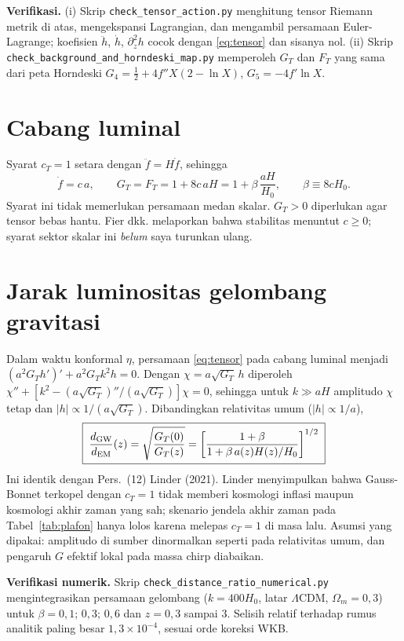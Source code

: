\documentclass[11pt,a4paper]{article}
\begin{document}
\textbf{Verifikasi.} (i) Skrip \texttt{check\_tensor\_action.py} menghitung tensor Riemann metrik di atas, mengekspansi Lagrangian, dan mengambil persamaan Euler-Lagrange; koefisien $\ddot h$, $\dot h$, $\partial_z^2h$ cocok dengan \eqref{eq:tensor} dan sisanya nol. (ii) Skrip \texttt{check\_background\_and\_horndeski\_map.py} memperoleh $G_T$ dan $F_T$ yang sama dari peta Horndeski $G_4=\tfrac12+4f''X(2-\ln X)$, $G_5=-4f'\ln X$.

\section{Cabang luminal}
Syarat $c_T=1$ setara dengan $\ddot f=H\dot f$, sehingga
\begin{equation}
\dot f=c\,a,\qquad G_T=F_T=1+8c\,aH=1+\beta\,\frac{aH}{H_0},\qquad \beta\equiv 8cH_0 .
\end{equation}
Syarat ini tidak memerlukan persamaan medan skalar. $G_T>0$ diperlukan agar tensor bebas hantu. Fier dkk. melaporkan bahwa stabilitas menuntut $c\ge 0$; syarat sektor skalar ini \emph{belum} saya turunkan ulang.

\section{Jarak luminositas gelombang gravitasi}
Dalam waktu konformal $\eta$, persamaan \eqref{eq:tensor} pada cabang luminal menjadi $(a^2G_Th')'+a^2G_Tk^2h=0$. Dengan $\chi=a\sqrt{G_T}\,h$ diperoleh $\chi''+\left[k^2-(a\sqrt{G_T})''/(a\sqrt{G_T})\right]\chi=0$, sehingga untuk $k\gg aH$ amplitudo $\chi$ tetap dan $|h|\propto 1/(a\sqrt{G_T})$. Dibandingkan relativitas umum ($|h|\propto1/a$),
\begin{equation}
\boxed{\;\frac{d_{\rm GW}}{d_{\rm EM}}(z)=\sqrt{\frac{G_T(0)}{G_T(z)}}=\left[\frac{1+\beta}{1+\beta\,a(z)H(z)/H_0}\right]^{1/2}\;}
\end{equation}
Ini identik dengan Pers.~(12) Linder (2021). Linder menyimpulkan bahwa Gauss-Bonnet terkopel dengan $c_T=1$ tidak memberi kosmologi inflasi maupun kosmologi akhir zaman yang sah; skenario jendela akhir zaman pada Tabel~\ref{tab:plafon} hanya lolos karena melepas $c_T=1$ di masa lalu. Asumsi yang dipakai: amplitudo di sumber dinormalkan seperti pada relativitas umum, dan pengaruh $G$ efektif lokal pada massa chirp diabaikan.

\textbf{Verifikasi numerik.} Skrip \texttt{check\_distance\_ratio\_numerical.py} mengintegrasikan persamaan gelombang ($k=400H_0$, latar $\Lambda$CDM, $\Omega_m=0{,}3$) untuk $\beta=0{,}1;\,0{,}3;\,0{,}6$ dan $z=0{,}3$ sampai $3$. Selisih relatif terhadap rumus analitik paling besar $1{,}3\times10^{-4}$, sesuai orde koreksi WKB.
\end{document}
